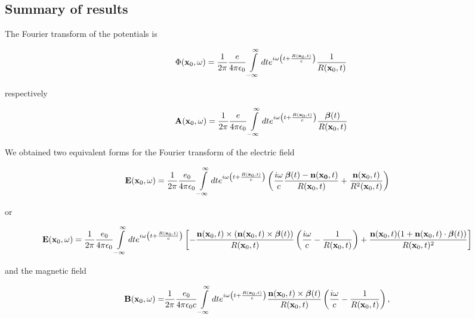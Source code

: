 \subsection{Summary of results}
The Fourier transform of the potentials is
\begin{tcolorbox}[colback=blue!5!white,colframe=blue!75!black]
    \begin{align}
        \Phi({\bf x}_0,\omega)=\frac1{2\pi}\frac{e}{4\pi\epsilon_0}\int\limits_{-\infty}^{\infty}dte^{i\omega\left( t+\frac{R({\bf x}_0,t)}{c}\right)}\frac{1}{R({\bf x}_0,t)}
    \end{align}
\end{tcolorbox}
respectively
\begin{tcolorbox}[colback=blue!5!white,colframe=blue!75!black]
    \begin{align}
        {\bf A}({\bf x}_0,\omega)=\frac1{2\pi}\frac{e}{4\pi\epsilon_0}\int\limits_{-\infty}^{\infty}dte^{i\omega\left( t+\frac{R({\bf x}_0,t)}{c}\right)}\frac{{\boldsymbol{\beta}}(t)}{R({\bf x}_0,t)}
    \end{align}
\end{tcolorbox}


We obtained two equivalent forms for the Fourier transform of the electric field
\begin{tcolorbox}[colback=blue!5!white,colframe=blue!75!black]
    \begin{align}
        {\bf E}({\bf x}_0,\omega) & =\frac1{2\pi}\frac{e_0}{4\pi\epsilon_0}\int\limits_{-\infty}^{\infty}dte^{i\omega\left( t+\frac{R({\bf x}_0,t)}{c}\right)}\left(\frac{i\omega}c\frac{{\boldsymbol{\beta}}(t)-{\bf n}({\bf x_0},t)}{R({\bf x}_0,t)}+\frac{{\bf n}({\bf x}_0,t)}{R^2({\bf x}_0,t)}\right)\label{exomega-f1}
    \end{align}
\end{tcolorbox}
or
\begin{tcolorbox}[colback=blue!5!white,colframe=blue!75!black]
    \begin{align}
        {\bf E}({\bf x}_0,\omega) & =\frac1{2\pi}\frac{e_0}{4\pi\epsilon_0}\int\limits_{-\infty}^{\infty}dte^{i\omega\left( t+\frac{R({\bf x}_0,t)}{c}\right)}\left[-\frac{{\bf n}({\bf x}_0,t)\times({\bf n}({\bf x}_0,t)\times{\boldsymbol{\beta}}(t))}{R({\bf x}_0,t)}\left(\frac{i\omega}c-\frac1{R({\bf x}_0,t)}\right)+\frac{{\bf n}({\bf x}_0,t)(1+{\bf n}({\bf x}_0,t)\cdot{\boldsymbol{\beta}}(t))}{R({\bf x}_0,t)^2}\right]\label{exomega-f2}
    \end{align}
\end{tcolorbox}

and the magnetic field
\begin{tcolorbox}[colback=blue!5!white,colframe=blue!75!black]
    \begin{align}
        {\bf B}({\bf x}_0,\omega)= & \frac1{2\pi}\frac{e_0}{4\pi\epsilon_0c}\int\limits_{-\infty}^{\infty}dt e^{i\omega \left(t+\frac{R({\bf x}_0,t)}c\right)}\frac{{\bf n}({\bf x}_0,t)\times{\boldsymbol{\beta}}(t)}{R({\bf x}_0,t)}\left(\frac{i\omega}c-\frac{1}{R({\bf x}_0,t)}\right),\label{bxomega-f1-oc1}
    \end{align}
\end{tcolorbox}

